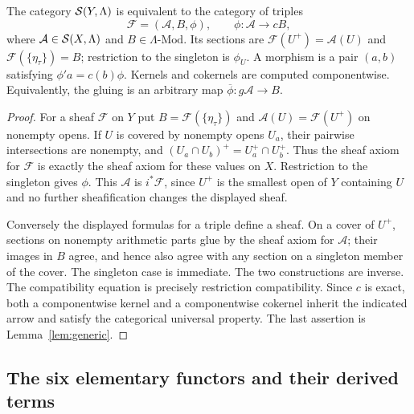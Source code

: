 \begin{theorem}\label{thm:triples}
The category $\mathcal S(Y,\Lambda)$ is equivalent to the category of triples
\[
 \mathcal F=(\mathcal A,B,\phi),\qquad
 \phi:\mathcal A\longrightarrow cB,
 \tag{RP3}\label{eq:triples}
\]
where $\mathcal A\in\mathcal S(X,\Lambda)$ and $B\in\Lambda\text{-}\mathrm{Mod}$.
Its sections are $\mathcal F(U^+)=\mathcal A(U)$ and
$\mathcal F(\{\eta_\tau\})=B$; restriction to the singleton is
$\phi_U$. A morphism is a pair $(a,b)$ satisfying
$\phi'a=c(b)\phi$. Kernels and cokernels are computed componentwise.
Equivalently, the gluing is an arbitrary map
$\overline\phi:g\mathcal A\to B$.
\end{theorem}
\begin{proof}
For a sheaf $\mathcal F$ on $Y$ put $B=\mathcal F(\{\eta_\tau\})$ and
$\mathcal A(U)=\mathcal F(U^+)$ on nonempty opens. If $U$ is covered
by nonempty opens $U_a$, their pairwise intersections are nonempty,
and $(U_a\cap U_b)^+=U_a^+\cap U_b^+$. Thus the sheaf axiom for
$\mathcal F$ is exactly the sheaf axiom for these values on $X$.
Restriction to the singleton gives $\phi$. This $\mathcal A$ is
$i^*\mathcal F$, since $U^+$ is the smallest open of $Y$ containing $U$
and no further sheafification changes the displayed sheaf.

Conversely the displayed formulas for a triple define a sheaf.
On a cover of $U^+$, sections on nonempty arithmetic parts glue by the
sheaf axiom for $\mathcal A$; their images in $B$ agree, and hence
also agree with any section on a singleton member of the cover.
The singleton case is immediate. The two constructions are inverse.
The compatibility equation is precisely restriction compatibility.
Since $c$ is exact, both a componentwise kernel and a componentwise
cokernel inherit the indicated arrow and satisfy the categorical
universal property. The last assertion is Lemma~\ref{lem:generic}.
\end{proof}

\subsection{The six elementary functors and their derived terms}

